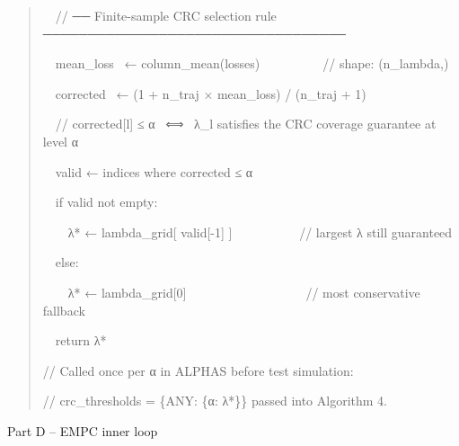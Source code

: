 \documentclass[11pt]{article}
\begin{document}
\begin{quote}
~~// ── Finite-sample CRC selection rule
──────────────────────────────────

~~mean\_loss~ ← column\_mean(losses)~ ~ ~ ~ ~ ~ // shape: (n\_lambda,)

~~corrected~ ← (1 + n\_traj × mean\_loss) / (n\_traj + 1)

~~// corrected{[}l{]} ≤ α~ ⟺~ λ\_l satisfies the CRC coverage guarantee
at level α

~~valid ← indices where corrected ≤ α

~~if valid not empty:

~~~~λ* ← lambda\_grid{[} valid{[}-1{]} {]} ~ ~ ~ ~ ~ ~ // largest λ
still guaranteed

~~else:

~~~~λ* ← lambda\_grid{[}0{]} ~ ~ ~ ~ ~ ~ ~ ~ ~ ~ ~ // most conservative
fallback

~~return λ*

// Called once per α in ALPHAS before test simulation:

// crc\_thresholds = \{\textquotesingle ANY\textquotesingle: \{α: λ*\}\}
passed into Algorithm 4.
\end{quote}

Part D -- EMPC inner loop
\end{document}
